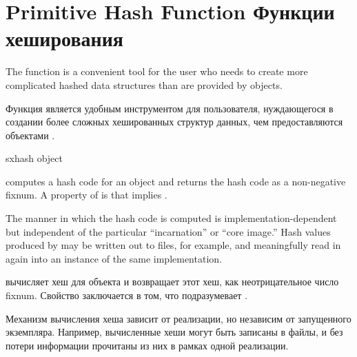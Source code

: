 \section{Primitive Hash Function Функции хеширования}

The function  is a convenient tool for the user who needs
to create more complicated hashed data structures than are provided by
 objects.

Функция  является удобным инструментом для пользователя,
нуждающегося в создании более сложных хешированных структур данных, чем
предоставляются объектами .

\begin{defun}[Function]
sxhash object

 computes a hash code for an object and returns the hash code as
a non-negative fixnum.  A property of 
is that  implies .

The manner in which the hash code is computed is implementation-dependent
but independent of the particular ``incarnation'' or ``core image.''
Hash values produced
by  may be written out to files, for example, and meaningfully
read in again into an instance of the same implementation.

 вычисляет хеш для объекта и возвращает этот хеш, как
неотрицательное число fixnum. Свойство  заключается в том, что
 подразумевает .

Механизм вычисления хеша зависит от реализации, но независим от запущенного
экземпляра.
Например, вычисленные  хеши могут быть записаны в файлы, и без
потери информации прочитаны из них в рамках одной реализации.
\end{defun}
